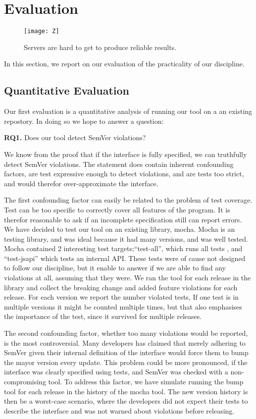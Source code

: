 \section{Evaluation}

\begin{figure}
\centering
\texttt{[image: Z]}
\caption{Servers are hard to get to produce reliable results.}
\end{figure}

In this section, we report on our evaluation of the practicality of
our discipline. 

\subsection{Quantitative Evaluation}

Our first evaluation is a quantitative analysis of running our tool on a
an existing repostory. In doing so we hope to answer a question:

{\bf RQ1.} Does our tool detect SemVer violations?

We know from the proof that if the interface is fully specified, we can
truthfully detect SemVer violations. The statement does contain 
inherent confounding factors, are test expressive enough to detect
violations, and are tests too strict, and would therefor over-approximate 
the interface.

The first confounding factor can easily be related to the problem of
test coverage. Test can be too specific to correctly cover all features
of the program. It is therefor reasonable to ask if an incomplete
specification still can report errors. We have decided to test our tool
on an existing library, mocha\cite{mocha}. Mocha is an testing library,
and was ideal because it had many versions, and was well tested. Mocha
contained 2 interesting test targets;``test-all'', which runs all tests
, and ``test-jsapi'' which tests an internal API\@. These tests were of
cause not designed to follow our discipline, but it enable to answer if
we are able to find any violations at all, assuming that they were. We
ran the tool for each release in the library and collect the breaking
change and added feature violations for each release. For each version
we report the number violated tests, If one test is in multiple versions
it might be counted multiple times, but that also emphasises the
importance of the test, since it survived for multiple releases.

The second confounding factor, whether too many violations would be
reported, is the most controversial. Many developers has claimed that
merely adhering to SemVer given their internal definition of the
interface would force them to bump the mayor version every
update\cite{backbone-2888,exoplayer-1382,crawford-not-semver}. This problem could be
more pronounced, if the interface was clearly specified using tests, and
SemVer was checked with a non-compromising tool. To address this factor,
we have simulate running the bump tool for each release in the history
of the mocha tool. The new version history is then be a worst-case
scenario, where the developers did not expect their tests to describe
the interface and was not warned about violations before releasing.

